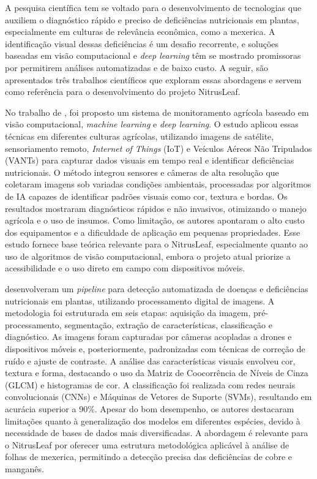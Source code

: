 A pesquisa científica tem se voltado para o desenvolvimento de tecnologias que auxiliem o diagnóstico rápido e preciso de deficiências nutricionais em plantas, especialmente em culturas de relevância econômica, como a mexerica. A identificação visual dessas deficiências é um desafio recorrente, e soluções baseadas em visão computacional e \textit{deep learning} têm se mostrado promissoras por permitirem análises automatizadas e de baixo custo. A seguir, são apresentados três trabalhos científicos que exploram essas abordagens e servem como referência para o desenvolvimento do projeto NitrusLeaf.

No trabalho de \textcite{Muthusamy2023}, foi proposto um sistema de monitoramento agrícola baseado em visão computacional, \textit{machine learning} e \textit{deep learning}. O estudo aplicou essas técnicas em diferentes culturas agrícolas, utilizando imagens de satélite, sensoriamento remoto, \textit{Internet of Things} (IoT) e Veículos Aéreos Não Tripulados (VANTs) para capturar dados visuais em tempo real e identificar deficiências nutricionais. O método integrou sensores e câmeras de alta resolução que coletaram imagens sob variadas condições ambientais, processadas por algoritmos de IA capazes de identificar padrões visuais como cor, textura e bordas. Os resultados mostraram diagnósticos rápidos e não invasivos, otimizando o manejo agrícola e o uso de insumos. Como limitação, os autores apontaram o alto custo dos equipamentos e a dificuldade de aplicação em pequenas propriedades. Esse estudo fornece base teórica relevante para o NitrusLeaf, especialmente quanto ao uso de algoritmos de visão computacional, embora o projeto atual priorize a acessibilidade e o uso direto em campo com dispositivos móveis.

\textcite{Ghorai2021} desenvolveram um \textit{pipeline} para detecção automatizada de doenças e deficiências nutricionais em plantas, utilizando processamento digital de imagens. A metodologia foi estruturada em seis etapas: aquisição da imagem, pré-processamento, segmentação, extração de características, classificação e diagnóstico. As imagens foram capturadas por câmeras acopladas a drones e dispositivos móveis e, posteriormente, padronizadas com técnicas de correção de ruído e ajuste de contraste. A análise das características visuais envolveu cor, textura e forma, destacando o uso da Matriz de Coocorrência de Níveis de Cinza (GLCM) e histogramas de cor. A classificação foi realizada com redes neurais convolucionais (CNNs) e Máquinas de Vetores de Suporte (SVMs), resultando em acurácia superior a 90\%. Apesar do bom desempenho, os autores destacaram limitações quanto à generalização dos modelos em diferentes espécies, devido à necessidade de bases de dados mais diversificadas. A abordagem é relevante para o NitrusLeaf por oferecer uma estrutura metodológica aplicável à análise de folhas de mexerica, permitindo a detecção precisa das deficiências de cobre e manganês.

